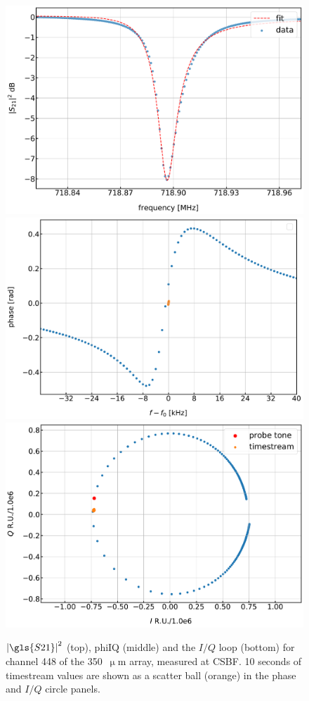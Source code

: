 \begin{figure}[ptbh]
\centering
\caption[~,  and the  loop for the 350~ example channel.]{$\left| \gls{S21} \right|^{2}$ (top), \gls{phiIQ} (middle) and the $I/Q$ loop (bottom) for channel 448 of the 350~$\upmu$m array, measured at CSBF. 10 seconds of timestream values are shown as a scatter ball (orange) in the phase and $I/Q$ circle panels.}
\includegraphics[scale=0.3]{figures/blast_data/timestreams/350_pal_S21_fit_448}
\includegraphics[scale=0.3]{figures/blast_data/timestreams/350_pal_freqNoiseBall_448}
\includegraphics[scale=0.3]{figures/blast_data/timestreams/350_pal_noiseball_448}

\end{figure}
